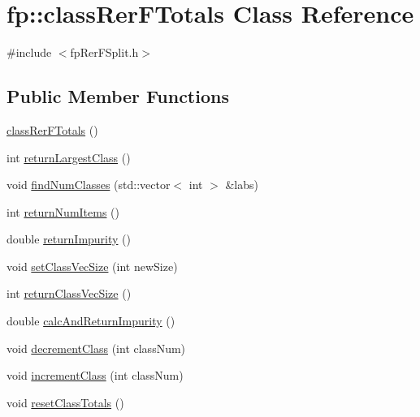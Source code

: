 \hypertarget{classfp_1_1classRerFTotals}{}\section{fp\+:\+:class\+Rer\+F\+Totals Class Reference}
\label{classfp_1_1classRerFTotals}


{\ttfamily \#include $<$fp\+Rer\+F\+Split.\+h$>$}

\subsection*{Public Member Functions}
\begin{DoxyCompactItemize}
\item 
\hyperlink{classfp_1_1classRerFTotals_abd2507c1abb28e164bc8e8fb514e04b4}{class\+Rer\+F\+Totals} ()
\item 
int \hyperlink{classfp_1_1classRerFTotals_a4d88f6b7bdaabd6dc03f443bdc5f5de0}{return\+Largest\+Class} ()
\item 
void \hyperlink{classfp_1_1classRerFTotals_a8956cc79012353b8a56c21cf79fe83d0}{find\+Num\+Classes} (std\+::vector$<$ int $>$ \&labs)
\item 
int \hyperlink{classfp_1_1classRerFTotals_a6a61995fc7a7a4914493fbef192da417}{return\+Num\+Items} ()
\item 
double \hyperlink{classfp_1_1classRerFTotals_afb6ce5c3e6de1bbf33d1ebe225bcecac}{return\+Impurity} ()
\item 
void \hyperlink{classfp_1_1classRerFTotals_a51bf817a7dafd4dab98d9cfe3841a41d}{set\+Class\+Vec\+Size} (int new\+Size)
\item 
int \hyperlink{classfp_1_1classRerFTotals_a3f9028fdb2c7cc6d098a7dd565bf6e68}{return\+Class\+Vec\+Size} ()
\item 
double \hyperlink{classfp_1_1classRerFTotals_acb145c7c137fecc8766b9616f80daff2}{calc\+And\+Return\+Impurity} ()
\item 
void \hyperlink{classfp_1_1classRerFTotals_aac0c0d5bc058592a51d1fceeaf38a8fd}{decrement\+Class} (int class\+Num)
\item 
void \hyperlink{classfp_1_1classRerFTotals_a1be2afa6bf6490104eac4c283abe62ef}{increment\+Class} (int class\+Num)
\item 
void \hyperlink{classfp_1_1classRerFTotals_a60fa9a8dab5fdbfe5c2cb8e6b1f24579}{reset\+Class\+Totals} ()
\end{DoxyCompactItemize}
